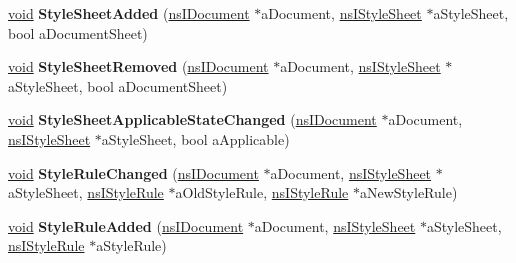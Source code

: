 \begin{DoxyCompactItemize}
\item 
\mbox{\label{interfacens_i_document_observer_a0651638f74fe2fd080a24e024e638b65}} 
\hyperlink{interfacevoid}{void} {\bfseries Style\+Sheet\+Added} (\hyperlink{interfacens_i_document}{ns\+I\+Document} $\ast$a\+Document, \hyperlink{interfacens_i_supports}{ns\+I\+Style\+Sheet} $\ast$a\+Style\+Sheet, bool a\+Document\+Sheet)
\item 
\mbox{\label{interfacens_i_document_observer_a7ef9b1f43b61bee8fe0b17e0759ba5f5}} 
\hyperlink{interfacevoid}{void} {\bfseries Style\+Sheet\+Removed} (\hyperlink{interfacens_i_document}{ns\+I\+Document} $\ast$a\+Document, \hyperlink{interfacens_i_supports}{ns\+I\+Style\+Sheet} $\ast$a\+Style\+Sheet, bool a\+Document\+Sheet)
\item 
\mbox{\label{interfacens_i_document_observer_a9ab110cee87465fec337098389960635}} 
\hyperlink{interfacevoid}{void} {\bfseries Style\+Sheet\+Applicable\+State\+Changed} (\hyperlink{interfacens_i_document}{ns\+I\+Document} $\ast$a\+Document, \hyperlink{interfacens_i_supports}{ns\+I\+Style\+Sheet} $\ast$a\+Style\+Sheet, bool a\+Applicable)
\item 
\mbox{\label{interfacens_i_document_observer_a241f13b433ea8f1e684c96484c822ab3}} 
\hyperlink{interfacevoid}{void} {\bfseries Style\+Rule\+Changed} (\hyperlink{interfacens_i_document}{ns\+I\+Document} $\ast$a\+Document, \hyperlink{interfacens_i_supports}{ns\+I\+Style\+Sheet} $\ast$a\+Style\+Sheet, \hyperlink{interfacens_i_supports}{ns\+I\+Style\+Rule} $\ast$a\+Old\+Style\+Rule, \hyperlink{interfacens_i_supports}{ns\+I\+Style\+Rule} $\ast$a\+New\+Style\+Rule)
\item 
\mbox{\label{interfacens_i_document_observer_aced96cd65bdf614b7a1c5c019e8fda23}} 
\hyperlink{interfacevoid}{void} {\bfseries Style\+Rule\+Added} (\hyperlink{interfacens_i_document}{ns\+I\+Document} $\ast$a\+Document, \hyperlink{interfacens_i_supports}{ns\+I\+Style\+Sheet} $\ast$a\+Style\+Sheet, \hyperlink{interfacens_i_supports}{ns\+I\+Style\+Rule} $\ast$a\+Style\+Rule)
\item 
\mbox{\label{interfacens_i_document_observer_a193984aed449b5059ff18d56caefa118}} 

\end{DoxyCompactItemize}

